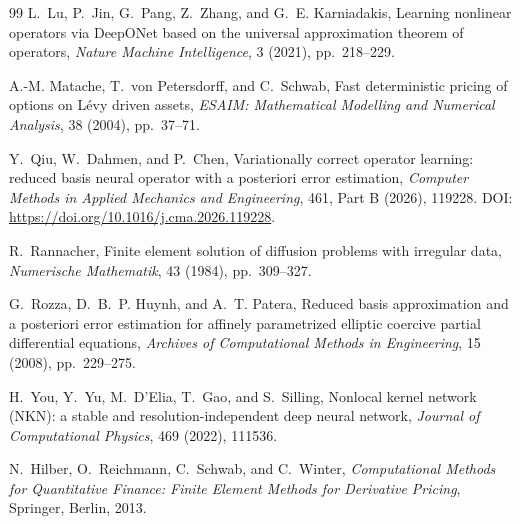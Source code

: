 \begin{thebibliography}{99}
L.~Lu, P.~Jin, G.~Pang, Z.~Zhang, and G.~E. Karniadakis,
\newblock Learning nonlinear operators via DeepONet based on the universal
approximation theorem of operators,
\newblock \emph{Nature Machine Intelligence}, 3 (2021), pp.~218--229.

A.-M. Matache, T.~von Petersdorff, and C.~Schwab,
\newblock Fast deterministic pricing of options on L\'evy driven assets,
\newblock \emph{ESAIM: Mathematical Modelling and Numerical Analysis},
38 (2004), pp.~37--71.

Y.~Qiu, W.~Dahmen, and P.~Chen,
\newblock Variationally correct operator learning: reduced basis neural
operator with a posteriori error estimation,
\newblock \emph{Computer Methods in Applied Mechanics and Engineering},
461, Part B (2026), 119228.
DOI: \url{https://doi.org/10.1016/j.cma.2026.119228}.

R.~Rannacher,
\newblock Finite element solution of diffusion problems with irregular data,
\newblock \emph{Numerische Mathematik}, 43 (1984), pp.~309--327.

G.~Rozza, D.~B.~P. Huynh, and A.~T. Patera,
\newblock Reduced basis approximation and a posteriori error estimation for
affinely parametrized elliptic coercive partial differential equations,
\newblock \emph{Archives of Computational Methods in Engineering},
15 (2008), pp.~229--275.

H.~You, Y.~Yu, M.~D'Elia, T.~Gao, and S.~Silling,
\newblock Nonlocal kernel network (NKN): a stable and resolution-independent
deep neural network,
\newblock \emph{Journal of Computational Physics}, 469 (2022), 111536.

N.~Hilber, O.~Reichmann, C.~Schwab, and C.~Winter,
\newblock \emph{Computational Methods for Quantitative Finance: Finite Element
Methods for Derivative Pricing},
\newblock Springer, Berlin, 2013.

\end{thebibliography}
